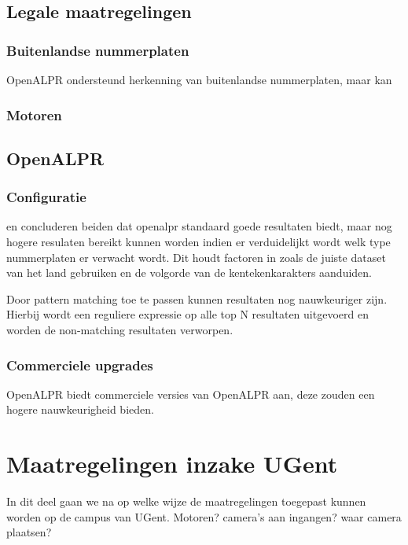\subsection{Legale maatregelingen}
\subsubsection{Buitenlandse nummerplaten}
OpenALPR ondersteund herkenning van buitenlandse nummerplaten, maar kan 

\subsubsection{Motoren}


\subsection{OpenALPR}

\subsubsection{Configuratie}
\textcite{arrieta2019prototype} en \textcite{buhus2016automatic} concluderen beiden dat openalpr standaard goede resultaten biedt, maar nog hogere resulaten bereikt kunnen worden indien er verduidelijkt wordt welk type nummerplaten er verwacht wordt. Dit houdt factoren in zoals de juiste dataset van het land gebruiken en de volgorde van de kentekenkarakters aanduiden.

Door pattern matching toe te passen kunnen resultaten nog nauwkeuriger zijn. Hierbij wordt een reguliere expressie op alle top N resultaten uitgevoerd en worden de non-matching resultaten verworpen.

\subsubsection{Commerciele upgrades}
OpenALPR biedt commerciele versies van OpenALPR aan, deze zouden een hogere nauwkeurigheid bieden.

\section{Maatregelingen inzake UGent}
In dit deel gaan we na op welke wijze de maatregelingen toegepast kunnen worden op de campus van UGent.  
Motoren?
camera's aan ingangen?
waar camera plaatsen?
